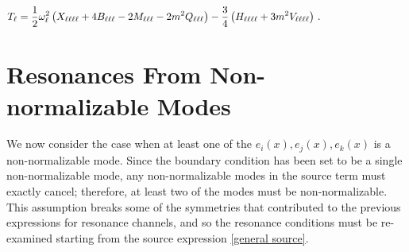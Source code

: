 \documentclass[letterpaper,11pt]{article}
\newcommand{\ol}{\omega_\ell}
\begin{document}
\begin{align}
T_{\ell} &= \frac{1}{2} \ol^2 \left( X_{\ell \ell \ell \ell} + 4 B_{\ell \ell \ell} -2 M_{\ell \ell \ell} - 2m^2 Q_{\ell \ell \ell} \right) -\frac{3}{4} \left( H_{\ell \ell \ell \ell} + 3m^2 V_{\ell \ell \ell \ell} \right) \, . \hspace{1.0in}
\end{align}


\section{Resonances From Non-normalizable Modes}

We now consider the case when at least one of the $e_i(x), e_j(x), e_k(x)$ is a non-normalizable mode. Since the boundary condition has been set to be a single non-normalizable mode, any non-normalizable modes in the source term must exactly cancel; therefore, at least two of the modes must be non-normalizable. This assumption breaks some of the symmetries that contributed to the previous expressions for resonance channels, and so the resonance conditions must be re-examined starting from the source expression \eqref{general source}.
\end{document}
